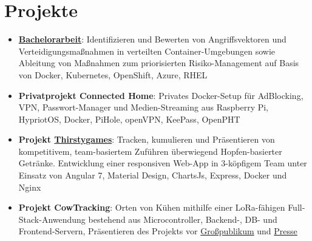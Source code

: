 \documentclass[letterpaper,11pt]{article}
\newcommand{\resumeSubHeadingListStart}{\begin{itemize}[leftmargin=*]}
\newcommand{\resumeItemListEnd}{\end{itemize}\vspace{-5pt}}
\begin{document}
\section{Projekte}
\resumeSubHeadingListStart
\item{
	\textbf{\href{https://github.com/gramsimamsi/bachelorThesis/blob/master/thesis.pdf}{Bachelorarbeit}}{: 	\linebreak 
		Identifizieren und Bewerten von Angriffsvektoren und Verteidigungsmaßnahmen in verteilten Container-Umgebungen sowie
		Ableitung von Maßnahmen zum priorisierten Risiko-Management auf Basis von
		Docker, Kubernetes, OpenShift, Azure, RHEL }
}
\item{
	\textbf{Privatprojekt Connected Home}{: 	\linebreak 
		Privates Docker-Setup für AdBlocking, VPN, Passwort-Manager und Medien-Streaming \linebreak
		aus Raspberry Pi, HypriotOS, Docker, PiHole, openVPN, KeePass, OpenPHT}
}
\item{
	\textbf{Projekt \href{https://github.com/gramsimamsi/thirstygames}{Thirstygames}}{: 	\linebreak 
		Tracken, kumulieren und Präsentieren von kompetitivem, team-basiertem \linebreak
		Zuführen überwiegend Hopfen-basierter Getränke. \linebreak 
		Entwicklung einer responsiven Web-App in 3-köpfigem Team unter Einsatz von \linebreak
		Angular 7, Material Design, ChartsJs, Express, Docker und Nginx }
}
\item{
	\textbf{Projekt CowTracking}{: 	\linebreak 
		Orten von Kühen mithilfe einer LoRa-fähigen Full-Stack-Anwendung \linebreak
		bestehend aus Microcontroller, Backend-, DB- und Frontend-Servern, \linebreak
		Präsentieren des Projekts vor 
		\href{https://www.youtube.com/watch?v=JIbElz2qEes}{Großpublikum}
		und \href{https://www.rfo.de/mediathek/video/digitalisierungsmesse-an-der-hochschule-rosenheim/}{Presse} }
}
\resumeItemListEnd

\end{document}

